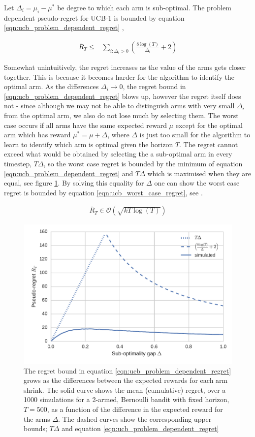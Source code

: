\documentclass[11pt,a4paper,oneside]{book}
\newcommand{\eqn}[1]{\begin{align}#1\end{align}}
\newcommand{\bigo}[1]{\mathcal{O}\left( #1 \right)}
\newcommand{\regret}{\bar{R}_{T}} %
\theoremstyle{plain}
\theoremstyle{definition}
\begin{document}
Let $\Delta_i = \mu_i - \mu^*$ be degree to which each arm is sub-optimal. The problem dependent pseudo-regret for UCB-1 is bounded by equation \ref{eqn:ucb_problem_dependent_regret} \citep{Bubeck2012},

\eqn {
\label{eqn:ucb_problem_dependent_regret}
\regret \leq & \sum_{i:\Delta_i > 0}\left(\frac{8\log(T)}{\Delta_i}+2 \right)
}

Somewhat unintuitively, the regret increases as the value of the arms gets closer together. This is because it becomes harder for the algorithm to identify the optimal arm. As the differences $\Delta_i \rightarrow 0$, the regret bound in \ref{eqn:ucb_problem_dependent_regret} blows up, however the regret itself does not - since although we may not be able to distinguish arms with very small $\Delta_i$ from the optimal arm, we also do not lose much by selecting them. The worst case occurs if all arms have the same expected reward $\mu$ except for the optimal arm which has reward $\mu^*=\mu+\Delta$, where $\Delta$ is just too small for the algorithm to learn to identify which arm is optimal given the horizon $T$. The regret cannot exceed what would be obtained by selecting the a sub-optimal arm in every timestep, $T\Delta$, so the worst case regret is bounded by the minimum of equation \ref{eqn:ucb_problem_dependent_regret} and $T\Delta$ which is maximised when they are equal, see figure \ref{fig:ucb_regret_vs_delta}. By solving this equality for $\Delta$ one can show the worst case regret is bounded by equation \ref{eqn:ucb_worst_case_regret}, see \citet{Bubeck2012}.

\eqn{
\label{eqn:ucb_worst_case_regret}
\regret \in \bigo{\sqrt{kT\log(T)}}
}  

\begin{figure}
\includegraphics[scale=1]{ucb_regret_vs_delta}
\caption{The regret bound in equation \ref{eqn:ucb_problem_dependent_regret} grows as the differences between the expected rewards for each arm shrink. The solid curve shows the mean (cumulative) regret, over a 1000 simulations for a 2-armed, Bernoulli bandit with fixed horizon, $T = 500$, as a function of the difference in the expected reward for the arms $\Delta$. The dashed curves show the corresponding upper bounds; $T\Delta$ and equation \ref{eqn:ucb_problem_dependent_regret}}
\label{fig:ucb_regret_vs_delta}
\end{figure}
\end{document}
